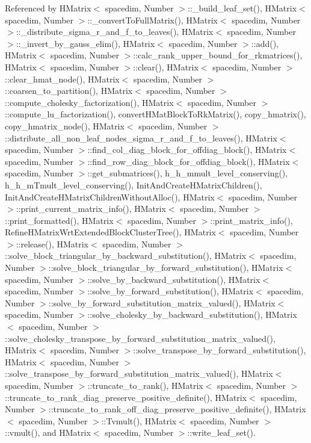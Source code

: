 Referenced by H\+Matrix$<$ spacedim, Number $>$\+::\+\_\+build\+\_\+leaf\+\_\+set(), H\+Matrix$<$ spacedim, Number $>$\+::\+\_\+convert\+To\+Full\+Matrix(), H\+Matrix$<$ spacedim, Number $>$\+::\+\_\+distribute\+\_\+sigma\+\_\+r\+\_\+and\+\_\+f\+\_\+to\+\_\+leaves(), H\+Matrix$<$ spacedim, Number $>$\+::\+\_\+invert\+\_\+by\+\_\+gauss\+\_\+elim(), H\+Matrix$<$ spacedim, Number $>$\+::add(), H\+Matrix$<$ spacedim, Number $>$\+::calc\+\_\+rank\+\_\+upper\+\_\+bound\+\_\+for\+\_\+rkmatrices(), H\+Matrix$<$ spacedim, Number $>$\+::clear(), H\+Matrix$<$ spacedim, Number $>$\+::clear\+\_\+hmat\+\_\+node(), H\+Matrix$<$ spacedim, Number $>$\+::coarsen\+\_\+to\+\_\+partition(), H\+Matrix$<$ spacedim, Number $>$\+::compute\+\_\+cholesky\+\_\+factorization(), H\+Matrix$<$ spacedim, Number $>$\+::compute\+\_\+lu\+\_\+factorization(), convert\+H\+Mat\+Block\+To\+Rk\+Matrix(), copy\+\_\+hmatrix(), copy\+\_\+hmatrix\+\_\+node(), H\+Matrix$<$ spacedim, Number $>$\+::distribute\+\_\+all\+\_\+non\+\_\+leaf\+\_\+nodes\+\_\+sigma\+\_\+r\+\_\+and\+\_\+f\+\_\+to\+\_\+leaves(), H\+Matrix$<$ spacedim, Number $>$\+::find\+\_\+col\+\_\+diag\+\_\+block\+\_\+for\+\_\+offdiag\+\_\+block(), H\+Matrix$<$ spacedim, Number $>$\+::find\+\_\+row\+\_\+diag\+\_\+block\+\_\+for\+\_\+offdiag\+\_\+block(), H\+Matrix$<$ spacedim, Number $>$\+::get\+\_\+submatrices(), h\+\_\+h\+\_\+mmult\+\_\+level\+\_\+conserving(), h\+\_\+h\+\_\+m\+Tmult\+\_\+level\+\_\+conserving(), Init\+And\+Create\+H\+Matrix\+Children(), Init\+And\+Create\+H\+Matrix\+Children\+Without\+Alloc(), H\+Matrix$<$ spacedim, Number $>$\+::print\+\_\+current\+\_\+matrix\+\_\+info(), H\+Matrix$<$ spacedim, Number $>$\+::print\+\_\+formatted(), H\+Matrix$<$ spacedim, Number $>$\+::print\+\_\+matrix\+\_\+info(), Refine\+H\+Matrix\+Wrt\+Extended\+Block\+Cluster\+Tree(), H\+Matrix$<$ spacedim, Number $>$\+::release(), H\+Matrix$<$ spacedim, Number $>$\+::solve\+\_\+block\+\_\+triangular\+\_\+by\+\_\+backward\+\_\+substitution(), H\+Matrix$<$ spacedim, Number $>$\+::solve\+\_\+block\+\_\+triangular\+\_\+by\+\_\+forward\+\_\+substitution(), H\+Matrix$<$ spacedim, Number $>$\+::solve\+\_\+by\+\_\+backward\+\_\+substitution(), H\+Matrix$<$ spacedim, Number $>$\+::solve\+\_\+by\+\_\+forward\+\_\+substitution(), H\+Matrix$<$ spacedim, Number $>$\+::solve\+\_\+by\+\_\+forward\+\_\+substitution\+\_\+matrix\+\_\+valued(), H\+Matrix$<$ spacedim, Number $>$\+::solve\+\_\+cholesky\+\_\+by\+\_\+backward\+\_\+substitution(), H\+Matrix$<$ spacedim, Number $>$\+::solve\+\_\+cholesky\+\_\+transpose\+\_\+by\+\_\+forward\+\_\+substitution\+\_\+matrix\+\_\+valued(), H\+Matrix$<$ spacedim, Number $>$\+::solve\+\_\+transpose\+\_\+by\+\_\+forward\+\_\+substitution(), H\+Matrix$<$ spacedim, Number $>$\+::solve\+\_\+transpose\+\_\+by\+\_\+forward\+\_\+substitution\+\_\+matrix\+\_\+valued(), H\+Matrix$<$ spacedim, Number $>$\+::truncate\+\_\+to\+\_\+rank(), H\+Matrix$<$ spacedim, Number $>$\+::truncate\+\_\+to\+\_\+rank\+\_\+diag\+\_\+preserve\+\_\+positive\+\_\+definite(), H\+Matrix$<$ spacedim, Number $>$\+::truncate\+\_\+to\+\_\+rank\+\_\+off\+\_\+diag\+\_\+preserve\+\_\+positive\+\_\+definite(), H\+Matrix$<$ spacedim, Number $>$\+::\+Tvmult(), H\+Matrix$<$ spacedim, Number $>$\+::vmult(), and H\+Matrix$<$ spacedim, Number $>$\+::write\+\_\+leaf\+\_\+set().

